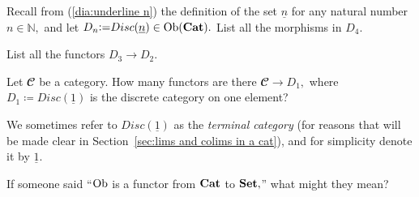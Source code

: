 \documentclass[../main/CT4S-EN-RU]{subfiles}
\begin{document}
\begin{exampleRUS}\label{ex:discrete graph discrete cat}
\end{exampleRUS}

\begin{exerciseENG}
Recall from (\ref{dia:underline n}) the definition of the set $\underline{n}$ for any natural number $n\in{ℕ},$ and let $D_n{\mathrel{\mathop:}=}Disc(\underline{n})\in\operatorname{Ob}({\mathbf{Cat}}).$
\sexc List all the morphisms in $D_4.$ 
\item List all the functors $D_3{→} D_2.$
\endsexc
\end{exerciseENG}

\begin{exerciseRUS}
\end{exerciseRUS}

\begin{exerciseENG}\label{exc:term cat}
Let ${𝓒}$ be a category. How many functors are there ${𝓒}{→} D_1,$ where $D_1{\coloneqq}Disc(\underline{1})$ is the discrete category on one element?
\end{exerciseENG}

\begin{exerciseRUS}\label{exc:term cat}
\end{exerciseRUS}

\begin{blockENG}
We sometimes refer to $Disc(\underline{1})$ as the {\em terminal category} (for reasons that will be made clear in Section~\ref{sec:lims and colims in a cat}), and for simplicity denote it by $\underline{1}.$
\end{blockENG}

\begin{blockRUS}
\end{blockRUS}

\begin{exerciseENG}\label{exc:Ob is a functor}
If someone said “$\operatorname{Ob}$ is a functor from ${\mathbf{Cat}}$ to ${\mathbf{Set}},$” what might they mean? 
\end{exerciseENG}

\begin{exerciseRUS}\label{exc:Ob is a functor}
\end{exerciseRUS}
\end{document}
